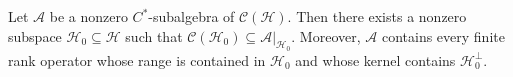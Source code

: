 Let $\mathcal{A}$ be a nonzero $C^*$-subalgebra of $\mathcal{C}(\mathcal{H})$. Then there exists a nonzero subspace $\mathcal{H}_0 \subseteq \mathcal{H}$ such that $\mathcal{C}(\mathcal{H}_0) \subseteq \mathcal{A}|_{\mathcal{H}_0}$. Moreover, $\mathcal{A}$ contains every finite rank operator whose range is contained in $\mathcal{H}_0$ and whose kernel contains $\mathcal{H}_0^\perp$.
